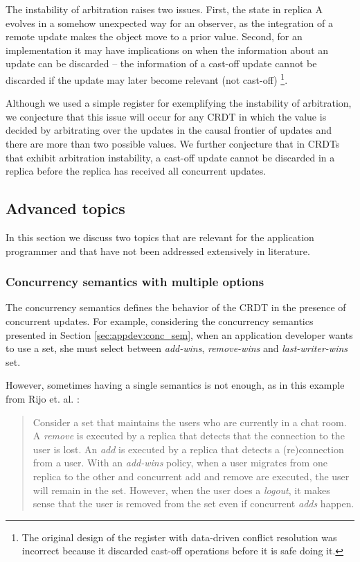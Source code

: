 \documentclass[12pt]{article}
\begin{document}
The instability of arbitration raises two issues.
First, the state in replica A evolves in a somehow unexpected way for an observer, 
as the integration of a remote update makes the object move to a prior value.
Second, for an implementation it may have implications on when the information about
an update can be discarded -- the information of a cast-off update cannot be discarded
if the update may later become relevant (not cast-off) \footnote{The original design
of the register with data-driven conflict resolution \cite{Zawirski:2016:ECR:2911151.2911157} 
was incorrect because it discarded cast-off operations before it is safe doing it.}.

Although we used a simple register for exemplifying the instability of arbitration,
we conjecture that this issue will occur for any CRDT in which the value is 
decided by arbitrating over the updates in the causal frontier of updates and there
are more than two possible values. 
We further conjecture that in CRDTs that exhibit arbitration instability, 
a cast-off update cannot be discarded in a replica before the replica has received all
concurrent updates. 

\subsection{Advanced topics}

In this section we discuss two topics that are relevant for the application
programmer and that have not been addressed extensively in literature.

\subsubsection{Concurrency semantics with multiple options} 

The concurrency semantics defines the behavior of the CRDT in the
presence of concurrent updates. 
For example, considering the concurrency semantics presented in Section \ref{sec:appdev:conc_sem},
when an application developer wants to use a set, she must select between 
\emph{add-wins}, \emph{remove-wins} and \emph{last-writer-wins} set.

However, sometimes having a single semantics is not enough, as in this example
from Rijo et. al. \cite{addremovewins}:

\begin{quotation}
Consider a set that maintains the users who are currently in a chat room. 
A \emph{remove} is executed by a replica that detects that the connection to the user is lost. 
An \emph{add} is executed by a replica that detects a (re)connection from a user. 
With an \emph{add-wins} policy, when a user migrates from one replica 
to the other and concurrent add and remove are executed, the user will remain in the set.
However, when the user does a \emph{logout}, it makes sense that the 
user is removed from the set even if concurrent \emph{adds} happen. 
\end{quotation}
\end{document}
